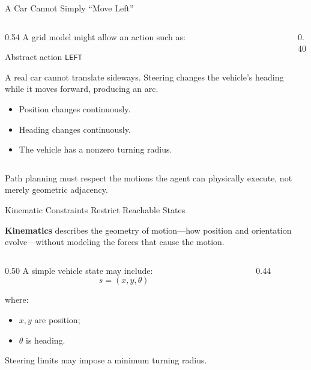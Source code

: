 \documentclass[aspectratio=169,10pt]{beamer}
\begin{document}
\begin{frame}[shrink=20]{A Car Cannot Simply ``Move Left''}
  \begin{columns}[T,onlytextwidth]
    \begin{column}{0.54\textwidth}
      A grid model might allow an action such as:

      \begin{block}{Abstract action}
        \centering
        \texttt{LEFT}
      \end{block}

      A real car cannot translate sideways. Steering changes the vehicle's heading while it moves forward, producing an arc.

      \begin{itemize}
        \item Position changes continuously.
        \item Heading changes continuously.
        \item The vehicle has a nonzero turning radius.
      \end{itemize}
    \end{column}

    \begin{column}{0.40\textwidth}
    \end{column}
  \end{columns}

  \begin{keyidea}
    Path planning must respect the motions the agent can physically execute, not merely geometric adjacency.
  \end{keyidea}
\end{frame}

\begin{frame}[shrink=20]{Kinematic Constraints Restrict Reachable States}
  \begin{cpdefinition}
    \textbf{Kinematics} describes the geometry of motion---how position and orientation evolve---without modeling the forces that cause the motion.
  \end{cpdefinition}

  \begin{columns}[T,onlytextwidth]
    \begin{column}{0.50\textwidth}
      A simple vehicle state may include:
      \[
        s=(x,y,\theta)
      \]

      where:
      \begin{itemize}
        \item $x,y$ are position;
        \item $\theta$ is heading.
      \end{itemize}

      Steering limits may impose a minimum turning radius.
    \end{column}

    \begin{column}{0.44\textwidth}
    \end{column}
  \end{columns}
\end{frame}
\end{document}
